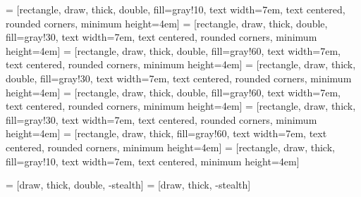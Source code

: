 
\begin{figure*}

  \begin{center}


     = [rectangle, draw, thick, double, fill=gray!10, text width=7em, text centered, rounded corners, minimum height=4em]
     = [rectangle, draw, thick, double, fill=gray!30, text width=7em, text centered, rounded corners, minimum height=4em]
     = [rectangle, draw, thick, double, fill=gray!60, text width=7em, text centered, rounded corners, minimum height=4em]
     = [rectangle, draw, thick, double, fill=gray!30, text width=7em, text centered, rounded corners, minimum height=4em]
     = [rectangle, draw, thick, double, fill=gray!60, text width=7em, text centered, rounded corners, minimum height=4em]
     = [rectangle, draw, thick, fill=gray!30, text width=7em, text centered, rounded corners, minimum height=4em]
     = [rectangle, draw, thick, fill=gray!60, text width=7em, text centered, rounded corners, minimum height=4em]
     = [rectangle, draw, thick, fill=gray!10, text width=7em, text centered, minimum height=4em]


     = [draw, thick, double, -stealth]
     = [draw, thick, -stealth]

\end{center}
\end{figure*}
